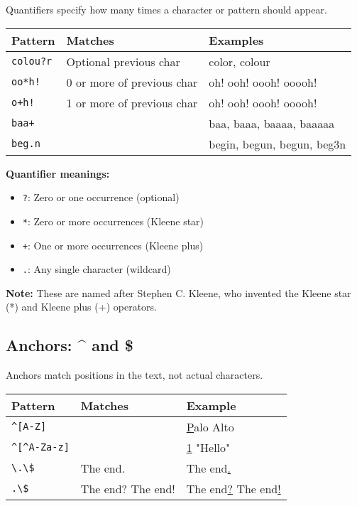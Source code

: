 \documentclass[11pt,a4paper]{article}
\theoremstyle{definition}
\theoremstyle{plain}
\theoremstyle{remark}
\begin{document}
Quantifiers specify how many times a character or pattern should appear.

\begin{table}[h]
\centering
\begin{tabular}{|l|l|l|}
\hline
\textbf{Pattern} & \textbf{Matches} & \textbf{Examples} \\
\hline
\texttt{colou?r} & Optional previous char & color, colour \\
\hline
\texttt{oo*h!} & 0 or more of previous char & oh! ooh! oooh! ooooh! \\
\hline
\texttt{o+h!} & 1 or more of previous char & oh! ooh! oooh! ooooh! \\
\hline
\texttt{baa+} & & baa, baaa, baaaa, baaaaa \\
\hline
\texttt{beg.n} & & begin, begun, begun, beg3n \\
\hline
\end{tabular}
\end{table}

\textbf{Quantifier meanings:}
\begin{itemize}
    \item \texttt{?}: Zero or one occurrence (optional)
    \item \texttt{*}: Zero or more occurrences (Kleene star)
    \item \texttt{+}: One or more occurrences (Kleene plus)
    \item \texttt{.}: Any single character (wildcard)
\end{itemize}

\textbf{Note:} These are named after Stephen C. Kleene, who invented the Kleene star (*) and Kleene plus (+) operators.

\subsection{Anchors: \^{} and \$}

Anchors match positions in the text, not actual characters.

\begin{table}[h]
\centering
\begin{tabular}{|l|l|l|}
\hline
\textbf{Pattern} & \textbf{Matches} & \textbf{Example} \\
\hline
\texttt{\^{}[A-Z]} & & \underline{P}alo Alto \\
\hline
\texttt{\^{}[\^{}A-Za-z]} & & \underline{1} "Hello" \\
\hline
\verb|\.\$| & The end. & The end\underline{.} \\
\hline
\verb|.\$| & The end? The end! & The end\underline{?} The end\underline{!} \\
\hline
\end{tabular}
\end{table}
\end{document}
